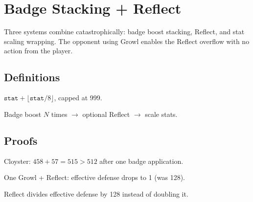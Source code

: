 \chapter{Badge Stacking + Reflect}\label{ch:badge_reflect}

Three systems combine catastrophically: badge boost stacking, Reflect, and stat scaling wrapping.
The opponent using Growl enables the Reflect overflow with no action from the player.

\section{Definitions}

\begin{definition}\label{def:badge_boost}
  \leanok
  $\texttt{stat} + \lfloor\texttt{stat}/8\rfloor$, capped at 999.
\end{definition}

\begin{definition}\label{def:full_pipeline}
  \leanok
  Badge boost $N$ times $\to$ optional Reflect $\to$ scale stats.
\end{definition}

\section{Proofs}

\begin{theorem}\label{thm:one_growl_512}
  \leanok
  Cloyster: $458 + 57 = 515 > 512$ after one badge application.
\end{theorem}

\begin{theorem}\label{thm:one_growl_reflect}
  \leanok
  One Growl + Reflect: effective defense drops to 1 (was 128).
\end{theorem}

\begin{theorem}\label{thm:reflect_128x}
  \leanok
  Reflect divides effective defense by 128 instead of doubling it.
\end{theorem}

